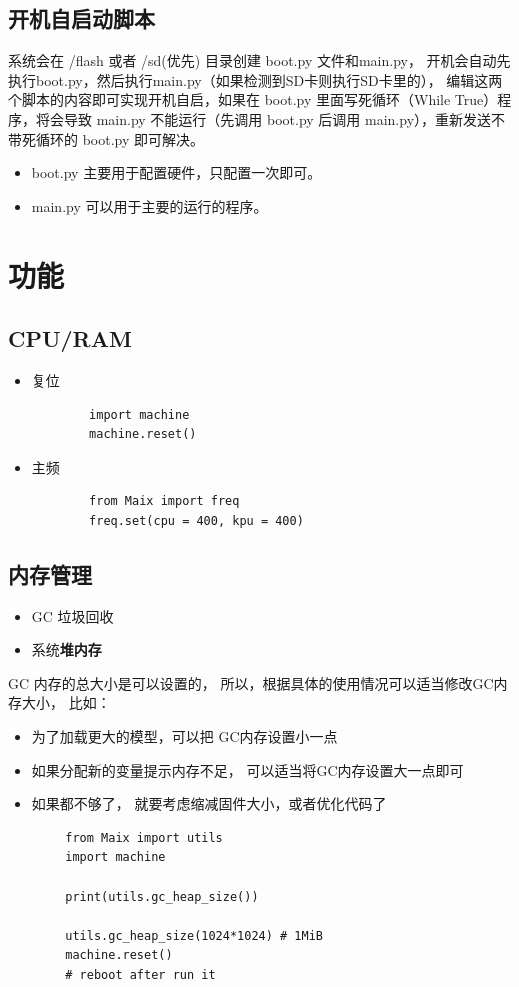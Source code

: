 \documentclass[UTF8]{ctexart}
\begin{document}
    \subsection{开机自启动脚本}
    系统会在 /flash 或者 /sd(优先) 目录创建 boot.py 文件和main.py， 开机会自动先执行boot.py，然后执行main.py（如果检测到SD卡则执行SD卡里的）， 编辑这两个脚本的内容即可实现开机自启，如果在 boot.py 里面写死循环（While True）程序，将会导致 main.py 不能运行（先调用 boot.py 后调用 main.py），重新发送不带死循环的 boot.py 即可解决。
    \begin{itemize}
        \item boot.py 主要用于配置硬件，只配置一次即可。
        \item main.py 可以用于主要的运行的程序。
    \end{itemize}

    \section{功能}
    \subsection{CPU/RAM}
    \begin{itemize}
        \item 复位
        \lstset{language=python}
    \begin{lstlisting}
        import machine
        machine.reset()
    \end{lstlisting}
        \item 主频
        \lstset{language=python}
    \begin{lstlisting}
        from Maix import freq
        freq.set(cpu = 400, kpu = 400)
    \end{lstlisting}
    \end{itemize}

    \subsection{内存管理}
    \begin{itemize}
        \item GC 垃圾回收
        \item 系统\textbf{堆内存}
    \end{itemize}
    GC 内存的总大小是可以设置的， 所以，根据具体的使用情况可以适当修改GC内存大小， 比如：
    \begin{itemize}
        \item 为了加载更大的模型，可以把 GC内存设置小一点
        \item 如果分配新的变量提示内存不足， 可以适当将GC内存设置大一点即可
        \item 如果都不够了， 就要考虑缩减固件大小，或者优化代码了
    \end{itemize}
    \lstset{language=python}
    \begin{lstlisting}
        from Maix import utils
        import machine

        print(utils.gc_heap_size())

        utils.gc_heap_size(1024*1024) # 1MiB
        machine.reset()  
        # reboot after run it
    \end{lstlisting}
\end{document}
